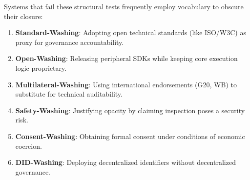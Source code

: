 \documentclass{article}
\begin{document}
Systems that fail these structural tests frequently employ vocabulary to obscure their closure:
\begin{enumerate}
    \item \textbf{Standard-Washing}: Adopting open technical standards (like ISO/W3C) as proxy for governance accountability.
    \item \textbf{Open-Washing}: Releasing peripheral SDKs while keeping core execution logic proprietary.
    \item \textbf{Multilateral-Washing}: Using international endorsements (G20, WB) to substitute for technical auditability.
    \item \textbf{Safety-Washing}: Justifying opacity by claiming inspection poses a security risk.
    \item \textbf{Consent-Washing}: Obtaining formal consent under conditions of economic coercion.
    \item \textbf{DID-Washing}: Deploying decentralized identifiers without decentralized governance.
\end{enumerate}
\end{document}

